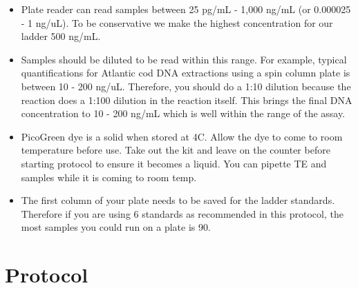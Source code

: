 \documentclass[
  letterpaper,
  DIV=11,
  numbers=noendperiod]{scrreprt}
\begin{document}
\begin{itemize}
\item
  Plate reader can read samples between 25 pg/mL - 1,000 ng/mL (or
  0.000025 - 1 ng/uL). To be conservative we make the highest
  concentration for our ladder 500 ng/mL.
\item
  Samples should be diluted to be read within this range. For example,
  typical quantifications for Atlantic cod DNA extractions using a spin
  column plate is between 10 - 200 ng/uL. Therefore, you should do a
  1:10 dilution because the reaction does a 1:100 dilution in the
  reaction itself. This brings the final DNA concentration to 10 - 200
  ng/mL which is well within the range of the assay.
\item
  PicoGreen dye is a solid when stored at 4C. Allow the dye to come to
  room temperature before use. Take out the kit and leave on the counter
  before starting protocol to ensure it becomes a liquid. You can
  pipette TE and samples while it is coming to room temp.
\item
  The first column of your plate needs to be saved for the ladder
  standards. Therefore if you are using 6 standards as recommended in
  this protocol, the most samples you could run on a plate is 90.
\end{itemize}

\hypertarget{protocol-5}{%
\section*{\texorpdfstring{\textbf{Protocol}}{Protocol}}\label{protocol-5}}

\end{document}
